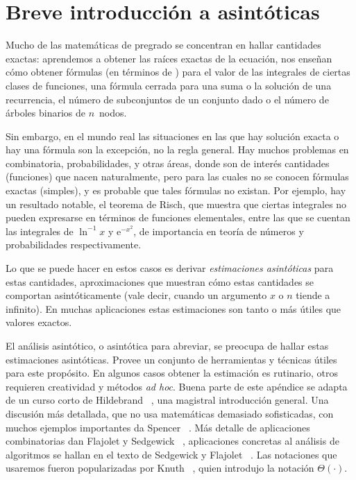 

\chapter{Breve introducción a asintóticas}
\label{apx:asymptotics}

  Mucho de las matemáticas de pregrado
  se concentran en hallar cantidades exactas:
  aprendemos a obtener las raíces exactas de la ecuación,
  nos enseñan cómo obtener fórmulas
  (en términos de )
  para el valor de las integrales de ciertas clases de funciones,
  una fórmula cerrada para una suma
  o la solución de una recurrencia,
  el número de subconjuntos de un conjunto dado
  o el número de árboles binarios de \(n\)~nodos.

  Sin embargo,
  en el mundo real las situaciones en las que hay solución exacta
  o hay una fórmula son la excepción,
  no la regla general.
  Hay muchos problemas en combinatoria,
  probabilidades,
  y otras áreas,
  donde son de interés cantidades (funciones) que nacen naturalmente,
  pero para las cuales no se conocen fórmulas exactas (simples),
  y es probable que tales fórmulas no existan.
  Por ejemplo,
  hay un resultado notable,
  el teorema de Risch,
  que muestra que ciertas integrales
  no pueden expresarse en términos de funciones elementales,
  entre las que se cuentan
  las integrales de \(\ln^{-1} x\) y \(\mathrm{e}^{-x^2}\),
  de importancia en teoría de números y probabilidades respectivamente.

  Lo que se puede hacer en estos casos
  es derivar \emph{estimaciones asintóticas} para estas cantidades,
  aproximaciones 
  que muestran cómo estas cantidades se comportan asintóticamente
  (vale decir,
   cuando un argumento \(x\) o \(n\) tiende a infinito).
  En muchas aplicaciones estas estimaciones
  son tanto o más útiles que valores exactos.

  El análisis asintótico,
  o asintótica para abreviar,
  se preocupa de hallar estas estimaciones asintóticas.
  Provee un conjunto de herramientas y técnicas útiles para este propósito.
  En algunos casos obtener la estimación es rutinario,
  otros requieren creatividad y métodos \emph{\foreignlanguage{latin}{ad hoc}}.
  Buena parte de este apéndice se adapta de un curso corto de Hildebrand~%
    \cite{hildebrand15:_short_course_asymptotics},
  una magistral introducción general.
  Una discusión más detallada,
  que no usa matemáticas demasiado sofisticadas,
  con muchos ejemplos importantes
  da Spencer~%
    \cite{spencer14:_asymptopia}.
  Más detalle de aplicaciones combinatorias
  dan Flajolet y Sedgewick~%
    \cite{flajolet09:_analy_combin},
  aplicaciones concretas al análisis de algoritmos
  se hallan en el texto de Sedgewick y Flajolet~%
    \cite{sedgewick13:_introd_anal_algor}.
  Las notaciones que usaremos fueron popularizadas por Knuth~%
    \cite{knuth76:_big_omicron_big_omega_big_theta},
  quien introdujo la notación \(\Theta(\cdot)\).

